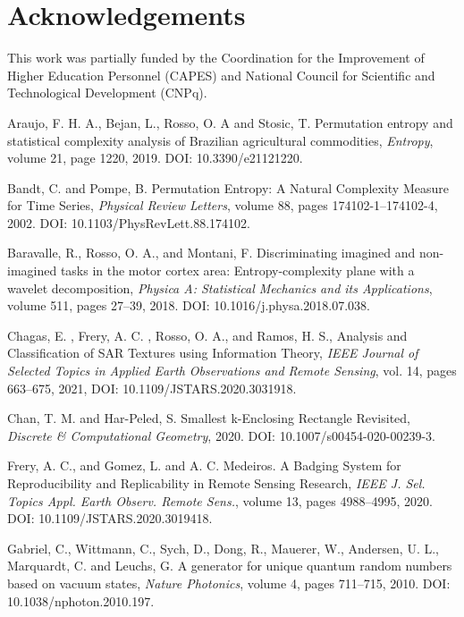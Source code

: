 \documentclass[a4,11pt]{pssbmac}
\begin{document}
\section*{Acknowledgements}

This work was partially funded by the Coordination for the Improvement of Higher Education Personnel (CAPES) and National Council for Scientific and Technological Development (CNPq).

\begin{thebibliography}{00}
	
	 Araujo, F. H. A., Bejan, L., Rosso, O. A and Stosic, T. 
	Permutation entropy and statistical complexity analysis of Brazilian agricultural commodities, 
	{\it Entropy}, 
	volume 21, 
	page 1220,
	2019. 
	DOI: 10.3390/e21121220.
	
	 Bandt, C. and Pompe, B.
	Permutation Entropy: A Natural Complexity Measure for Time Series,
	{\it Physical Review Letters}, 
	volume 88, 
	pages 174102-1--174102-4,
	2002.
	DOI: 10.1103/PhysRevLett.88.174102.
	
	 Baravalle, R., Rosso, O. A., and Montani, F. 
	Discriminating imagined and non-imagined tasks in the motor cortex area: Entropy-complexity plane with a wavelet decomposition, 
	{\it Physica A: Statistical Mechanics and its Applications}, 
	volume 511, 
	pages 27--39,
	2018. 
	DOI: 10.1016/j.physa.2018.07.038.
	
	Chagas, E. , Frery, A. C. , Rosso, O. A., and Ramos, H. S., Analysis and Classification of SAR Textures using Information Theory, \textit{IEEE Journal of Selected Topics in Applied Earth Observations and Remote Sensing}, vol. 14, pages 663--675, 2021, DOI: 10.1109/JSTARS.2020.3031918.
	
	
	 Chan, T. M. and Har-Peled, S.
	Smallest k-Enclosing Rectangle Revisited,
	{\it Discrete {\&} Computational Geometry},
	2020. 
	DOI: 10.1007/s00454-020-00239-3.
	
	 Frery, A. C., and Gomez, L. and A. C. Medeiros.
	A Badging System for Reproducibility and Replicability in Remote Sensing Research,
	{\it IEEE J. Sel. Topics Appl. Earth Observ. Remote Sens.}, 
	volume 13, 
	pages 4988--4995,
	2020.
	DOI: 10.1109/JSTARS.2020.3019418.
	
	 Gabriel, C., Wittmann, C., Sych, D., Dong, R., Mauerer, W., Andersen, U. L., Marquardt, C. and Leuchs, G.
	A generator for unique quantum random numbers based on vacuum states,
	{\it Nature Photonics}, 
	volume 4, 
	pages 711--715,
	2010. 
	DOI: 10.1038/nphoton.2010.197.
	

\end{thebibliography}
\end{document}
